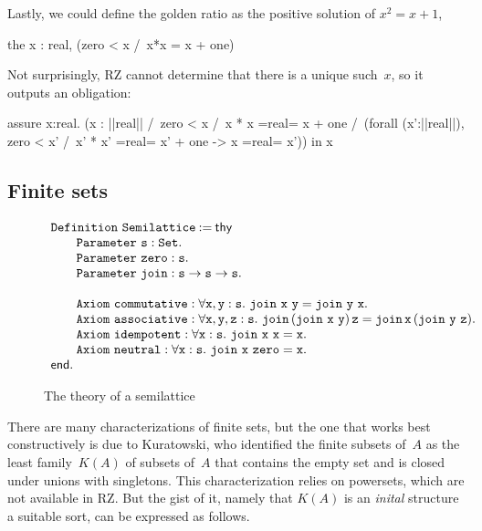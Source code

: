 \iflong
Lastly, we could define the golden ratio as the positive solution of
$x^2 = x + 1$,
%
\begin{source}
the x : real, (zero < x /\ x*x = x + one)
\end{source}
%
Not surprisingly, RZ cannot determine that there is a unique such~$x$,
so it outputs an obligation:
%
\begin{source}
assure x:real.
  (x : ||real|| /\ zero < x /\ x * x =real= x + one /\
     (forall (x':||real||),  zero < x' /\ x' * x' =real= x' + one ->
        x =real= x'))
  in x
\end{source}
\fi %

\subsection{Finite sets}
\label{sec:finite-sets}

\begin{figure}[t]
  \centering
\[
\begin{array}{l}
\iDefinition{\mathtt{Semilattice}}{\mathsf{thy}}\\
\qquad \iParameter{\mathtt{s}}{\iSet}.\\
\qquad \iParameter{\mathtt{zero}}{\mathtt{s}}.\\
\qquad \iParameter{\mathtt{join}}{\mathtt{s}\to\mathtt{s}\to\mathtt{s}}.\\
\\
\qquad \iAxiom{\mathtt{commutative}}{\forall \mathtt{x},\mathtt{y}:\mathtt{s}.\ \mathtt{join\ x\ y} = \mathtt{join\ y\ x}}.\\
\qquad \iAxiom{\mathtt{associative}}{\forall \mathtt{x},\mathtt{y},\mathtt{z}:\mathtt{s}.\ \mathtt{join}\,(\mathtt{join\ x\ y})\,\mathtt{z} = \mathtt{join}\,\mathtt{x}\, (\mathtt{join\ y\ z})}.\\
\qquad \iAxiom{\mathtt{idempotent}}{\forall \mathtt{x}:\mathtt{s}.\ \mathtt{join\ x\ x} = \mathtt{x}}.\\
\qquad \iAxiom{\mathtt{neutral}}{\forall \mathtt{x}:\mathtt{s}.\ \mathtt{join\ x\ zero} = \mathtt{x}}.\\
\mathsf{end}.
\end{array}
\]
  \caption{The theory of a semilattice}
  \label{fig:semilattice}
\end{figure}

There are many characterizations of finite sets, but the one that
works best constructively is due to Kuratowski, who identified the
finite subsets of~$A$ as the least family~$K(A)$ of subsets of~$A$
that contains the empty set and is closed under unions with
singletons. This characterization relies on powersets, which are not
available in RZ. But the gist of it, namely that $K(A)$ is an
\emph{inital} structure a suitable sort, can be expressed as follows.



